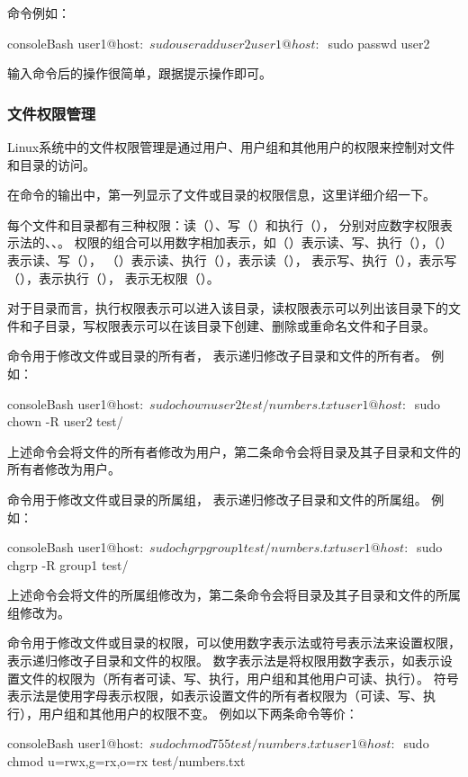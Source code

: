 命令例如：
\begin{envcode}{console}{Bash}
user1@host:~$ sudo useradd user2
user1@host:~$ sudo passwd user2
\end{envcode}

输入命令后的操作很简单，跟据提示操作即可。

\subsubsection{文件权限管理}
Linux系统中的文件权限管理是通过用户、用户组和其他用户的权限来控制对文件和目录的访问。

在命令的输出中，第一列显示了文件或目录的权限信息，这里详细介绍一下。

每个文件和目录都有三种权限：读（）、写（）和执行（），
分别对应数字权限表示法的、、。
权限的组合可以用数字相加表示，如（）表示读、写、执行（），（）表示读、写（），
（）表示读、执行（），表示读（），
表示写、执行（），表示写（），表示执行（），
表示无权限（\code{---}）。

对于目录而言，执行权限表示可以进入该目录，读权限表示可以列出该目录下的文件和子目录，写权限表示可以在该目录下创建、删除或重命名文件和子目录。

命令用于修改文件或目录的所有者， 表示递归修改子目录和文件的所有者。
例如：
\begin{envcode}{console}{Bash}
user1@host:~$ sudo chown user2 test/numbers.txt
user1@host:~$ sudo chown -R user2 test/
\end{envcode}
上述命令会将文件的所有者修改为用户，第二条命令会将目录及其子目录和文件的所有者修改为用户。

命令用于修改文件或目录的所属组， 表示递归修改子目录和文件的所属组。
例如：
\begin{envcode}{console}{Bash}
user1@host:~$ sudo chgrp group1 test/numbers.txt
user1@host:~$ sudo chgrp -R group1 test/
\end{envcode}
上述命令会将文件的所属组修改为，第二条命令会将目录及其子目录和文件的所属组修改为。

命令用于修改文件或目录的权限，可以使用数字表示法或符号表示法来设置权限，表示递归修改子目录和文件的权限。
数字表示法是将权限用数字表示，如表示设置文件的权限为（所有者可读、写、执行，用户组和其他用户可读、执行）。
符号表示法是使用字母表示权限，如表示设置文件的所有者权限为（可读、写、执行），用户组和其他用户的权限不变。
例如以下两条命令等价：
\begin{envcode}{console}{Bash}
user1@host:~$ sudo chmod 755 test/numbers.txt
user1@host:~$ sudo chmod u=rwx,g=rx,o=rx test/numbers.txt
\end{envcode}

